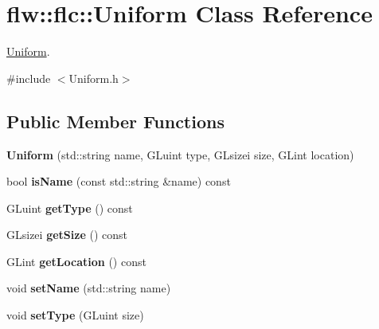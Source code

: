 \hypertarget{classflw_1_1flc_1_1Uniform}{}\section{flw\+:\+:flc\+:\+:Uniform Class Reference}
\label{classflw_1_1flc_1_1Uniform}


\hyperlink{classflw_1_1flc_1_1Uniform}{Uniform}.  




{\ttfamily \#include $<$Uniform.\+h$>$}

\subsection*{Public Member Functions}
\begin{DoxyCompactItemize}
\item 
{\bfseries Uniform} (std\+::string name, G\+Luint type, G\+Lsizei size, G\+Lint location)\hypertarget{classflw_1_1flc_1_1Uniform_a41fbec969fc924faed6db901349812de}{}\label{classflw_1_1flc_1_1Uniform_a41fbec969fc924faed6db901349812de}

\item 
bool {\bfseries is\+Name} (const std\+::string \&name) const \hypertarget{classflw_1_1flc_1_1Uniform_afd5e97eef58899465cf26f02ed8ba9f1}{}\label{classflw_1_1flc_1_1Uniform_afd5e97eef58899465cf26f02ed8ba9f1}

\item 
G\+Luint {\bfseries get\+Type} () const \hypertarget{classflw_1_1flc_1_1Uniform_aa193011b19453913f00d8a03f7dada82}{}\label{classflw_1_1flc_1_1Uniform_aa193011b19453913f00d8a03f7dada82}

\item 
G\+Lsizei {\bfseries get\+Size} () const \hypertarget{classflw_1_1flc_1_1Uniform_a327c3dbf94fd791ccbaeec3dc8e2081f}{}\label{classflw_1_1flc_1_1Uniform_a327c3dbf94fd791ccbaeec3dc8e2081f}

\item 
G\+Lint {\bfseries get\+Location} () const \hypertarget{classflw_1_1flc_1_1Uniform_afcb13c0ec39c84bd774308befeaf45a5}{}\label{classflw_1_1flc_1_1Uniform_afcb13c0ec39c84bd774308befeaf45a5}

\item 
void {\bfseries set\+Name} (std\+::string name)\hypertarget{classflw_1_1flc_1_1Uniform_aca1abbba83730199c9df8a237625d23b}{}\label{classflw_1_1flc_1_1Uniform_aca1abbba83730199c9df8a237625d23b}

\item 
void {\bfseries set\+Type} (G\+Luint size)\hypertarget{classflw_1_1flc_1_1Uniform_a7c3fd1233f2beb1f93b7fc6f14b8987e}{}\label{classflw_1_1flc_1_1Uniform_a7c3fd1233f2beb1f93b7fc6f14b8987e}


\end{DoxyCompactItemize}
